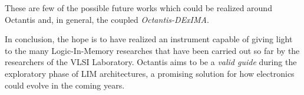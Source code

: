 These are few of the possible future works which could be realized around Octantis and, in general, the coupled {\itshape Octantis-\/\+D\+Ex\+I\+MA}.

In conclusion, the hope is to have realized an instrument capable of giving light to the many Logic-\/\+In-\/\+Memory researches that have been carried out so far by the researchers of the V\+L\+SI Laboratory. Octantis aims to be a {\itshape valid guide} during the exploratory phase of L\+IM architectures, a promising solution for how electronics could evolve in the coming years. 

 